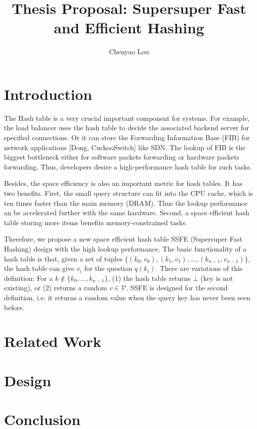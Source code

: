 \documentclass{article}
\title{Thesis Proposal: Supersuper Fast and Efficient Hashing}
\author{Chenyao Lou}
\begin{document}
\maketitle

\section{Introduction}


The Hash table is a very crucial important component for systems. For example, the load balancer uses the hash table to decide the associated backend server for specified connections. Or it can store the Forwarding Information Base (FIB) for network applications [Dong, CuckooSwitch] like SDN. The lookup of FIB is the biggest bottleneck either for software packets forwarding or hardware packets forwarding. Thus, developers desire a high-performance hash table for such tasks.

Besides, the space efficiency is also an important metric for hash tables. It has two benefits. First, the small query structure can fit into the CPU cache, which is ten times faster than the main memory (DRAM). Thus the lookup performance an be accelerated further with the same hardware. Second, a space efficient hash table storing more items benefits memory-constrained tasks.


Therefore, we propose a new space efficient hash table SSFE (Supersuper Fast Hashing) design with the high lookup performance. The basic functionality of a hash table is that, given a set of tuples $\{(k_0, v_0), (k_1, v_1), ..., (k_{n-1}, v_{n-1})\}$, the hash table can give $v_i$ for the question $q(k_i)$. There are variations of this definition: For a $k \not\in \{k_0, ..., k_{n-1}\}$, (1) the hash table returns $\bot$ (key is not existing), or (2) returns a random $v \in \mathcal{V}$. SSFE is designed for the second definition, i.e. it returns a random value when the query key has never been seen before.


\section{Related Work}

\section{Design}

\section{Conclusion}




\end{document}
